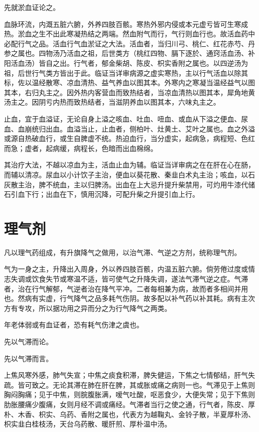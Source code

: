 \documentclass[UTF8]{ctexart}
\begin{document}
先就淤血证论之。

血脉环流，内溉五脏六腑，外养四肢百骸。寒热外邪内侵或本元虚亏皆可生寒成热。淤血之生不出此寒凝热结之两端。然血附气而行，气行则血行也。故活血药中必配行气之品。活血行气血淤证之大法。活血者，当归川弓、桃仁、红花赤芍、丹参之属也。四物汤乃活血之祖，后世类方（桃红四物、膈下逐於、通窍活血汤、补阳活血汤）皆自之出。行气者，郁金柴胡、陈皮、枳实香附之属也。以四逆汤为祖，后世行气类方皆出于此。临证当详审病源之虚实寒热，主以行气活血以除其标，佐以温经散寒、凉血清热、益气养血以图其本。外寒内之寒凝当温经益气以图其本，右归丸主之。因外热内客营血而致热结者，当凉血清热以图其本，犀角地黄汤主之。因阴亏内热而致热结者，当滋阴养血以图其本，六味丸主之。

止血，宜于血溢证，无论自身上溢之咳血、吐血、吜血、或血从下溢之便血、尿血、血崩统归出血。血溢当止，止血者，侧柏叶、灶黄土、艾叶之属也。血之外溢或源自热破血行，或生自脾虚不统。热迫血行，当分虚实，起病急，病程短、色红而急；虚者，起病缓，病程长，色暗而出血棉绵。

其治疗大法，不越以凉血为主，活血止血为辅。临证当详审病之在在肝在心在肠，而辅以清凉。尿血以小计饮子主治，便血以葵花散、秦韭白术丸主治；咳血，以石灰散主治，脾不统血，主以归脾汤。出血在上大忌升提升柴禁用，可灼用牛漆代储石引血下行；出血在下，慎用沉降，可配升柴之升提引血上行。

\section{理气剂}
凡以理气药组成，有升旗降气之做用，以治气滞、气逆之方剂，统称理气剂。

气为一身之主，升降出入周身，外以养四肢百骸，内温五脏六腑。倘劳倦过度或情志失调或饮食失节或寒温不适，皆可使气之升降失调，遂法气滞气逆之症。气滞者，治在行气解郁，气逆者治在降气平冲。二者每相兼为病，故而者多相间并用也。然病有实虚，行气降气之品多耗气伤阴。故多配以补气药以补其耗。病有主次方有专攻，所以据功用之异而分之为行气降气之两类。

年老体弱或有血证者，恐有耗气伤津之虞也。

先以气滞而论。

先以气滞而言。

上焦风寒外感，肺气失宣；中焦之痰食积滞，脾失健运，下焦之七情郁结，肝气失疏。皆可致之。无论其滞在肺在肝在脾，其或胀或痛之病则一也。气滞见于上焦则胸闷胸痛；见于中焦，则脘腹胀满，嗳气吐酸，呕恶食少，大便失常；见于下焦则肋胀腰痛少腹痛，女则月经不调或痛经。气滞者当行之使之通，行气者，陈皮、厚朴、木香、枳实、乌药、香附之属也，代表方为越鞠丸、金铃子散，半夏厚朴汤、枳实韭白桂枝汤，天台乌药散、暖肝煎、厚朴温中汤。
\end{document}
